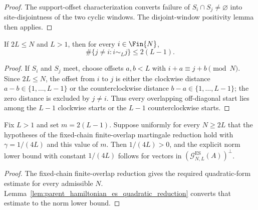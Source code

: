 \begin{proof}
    \leanok
    The support-offset characterization converts failure of $S_i\cap S_j\ne\varnothing$
    into site-disjointness of the two cyclic windows. The disjoint-window
    positivity lemma then applies.
\end{proof}

\begin{lemma}
    \label{lem:cyclic_window_overlap_cardinality}
    \leanok
    If $2L\le N$ and $L>1$, then for every $i\in\Fin{N}$,
    \[
        \#\{j\ne i: i\sim_L j\}\le 2(L-1).
    \]
\end{lemma}

\begin{proof}
    \leanok
    If $S_i$ and $S_j$ meet, choose offsets $a,b<L$ with
    $i+a\equiv j+b\pmod N$. Since $2L\le N$, the offset from $i$ to $j$ is
    either the clockwise distance $a-b\in\{1,\ldots,L-1\}$ or the
    counterclockwise distance $b-a\in\{1,\ldots,L-1\}$; the zero distance is
    excluded by $j\ne i$. Thus every overlapping off-diagonal start lies among
    the $L-1$ clockwise starts or the $L-1$ counterclockwise starts.
\end{proof}

\begin{lemma}
    \label{lem:parent_hamiltonian_finite_overlap_friedrichs_gap}
    \leanok
    Fix $L>1$ and set $m=2(L-1)$. Suppose uniformly for every $N\ge2L$ that
    the hypotheses of the fixed-chain finite-overlap martingale reduction hold
    with $\gamma=1/(4L)$ and this value of $m$. Then $1/(4L)>0$, and the
    explicit norm lower bound with constant $1/(4L)$ follows for vectors in
    $(\mathcal G_{N,L}^{\mathrm{ES}}(A))^\perp$.
\end{lemma}

\begin{proof}
    \leanok
    The fixed-chain finite-overlap reduction gives the required quadratic-form
    estimate for every admissible $N$. Lemma~\ref{lem:parent_hamiltonian_es_quadratic_reduction}
    converts that estimate to the norm lower bound.
\end{proof}

